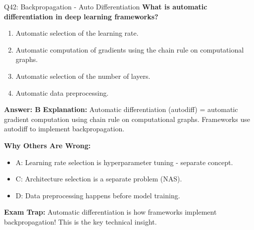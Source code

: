 \documentclass[8pt]{beamer}
\begin{document}
	\begin{frame}{Q42: Backpropagation - Auto Differentiation}
		\fontsize{6.5}{7.5}\selectfont
		\textbf{What is automatic differentiation in deep learning frameworks?}
		
		\begin{enumerate}
			\item Automatic selection of the learning rate.
			\item Automatic computation of gradients using the chain rule on computational graphs.
			\item Automatic selection of the number of layers.
			\item Automatic data preprocessing.
		\end{enumerate}
		
		\vspace{0.05cm}
		\textcolor{myblue}{\textbf{Answer: B}}
		\vspace{0.05cm}
		\textcolor{myblue}{\textbf{Explanation:}} Automatic differentiation (autodiff) = automatic gradient computation using chain rule on computational graphs. Frameworks use autodiff to implement backpropagation.
		
		\vspace{0.05cm}
		\textcolor{myred}{\textbf{Why Others Are Wrong:}}
		\begin{itemize}
			\item \textcolor{myred}{A:} Learning rate selection is hyperparameter tuning - separate concept.
			\item \textcolor{myred}{C:} Architecture selection is a separate problem (NAS).
			\item \textcolor{myred}{D:} Data preprocessing happens before model training.
		\end{itemize}
		
		\textcolor{myred}{\textbf{Exam Trap:}} Automatic differentiation is how frameworks implement \textcolor{myblue}{backpropagation}! This is the key technical insight.
	\end{frame}
	
\end{document}
